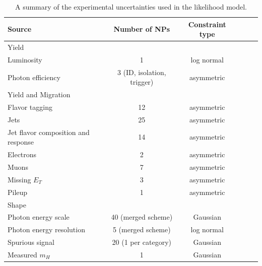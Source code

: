 \begin{table}[ht]
\begin{center}
\begin{tabular}{lccccc}
\hline
Source & Number of NPs & Constraint type \\ \hline
Yield \\ \hline
Luminosity & 1 & log normal  \\
Photon efficiency & 3 (ID, isolation, trigger) & asymmetric \\
\hline
Yield and Migration \\ \hline
Flavor tagging & 12 & asymmetric \\
Jets & 25 & asymmetric \\
Jet flavor composition and response & 14 & asymmetric \\
Electrons & 2 & asymmetric \\
Muons & 7 & asymmetric\\
Missing $E_{T}$ & 3 & asymmetric\\
Pileup & 1 & asymmetric \\
\hline
Shape \\ \hline
Photon energy scale & 40 (merged scheme) & Gaussian  \\
Photon energy resolution & 5 (merged scheme) & log normal \\
Spurious signal & 20 (1 per category) & Gaussian \\
Measured $m_H$ & 1 & Gaussian \\
\end{tabular}
\end{center}
\vspace{-0.5cm}
\caption{A summary of the experimental uncertainties used in the likelihood model.}
\label{tab:expsyst}
\end{table}

